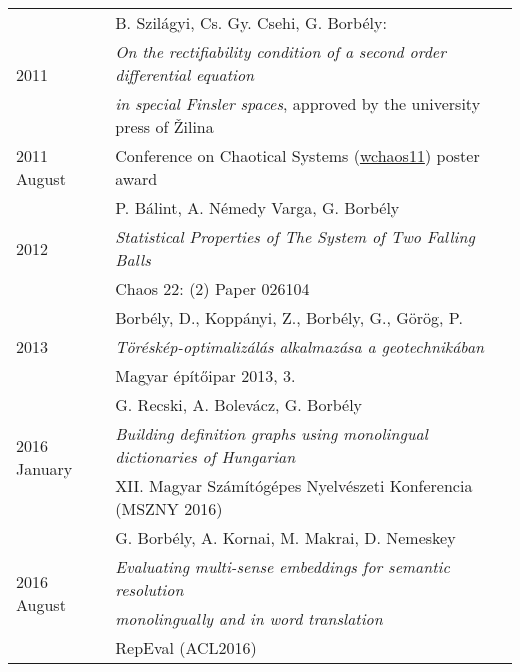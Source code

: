 \documentclass[12pt]{article}
\begin{document}
        \begin{tabular}{p{3.5cm}l}
		   \multirow{3}{*}[15pt]{2011}& B. Szilágyi, Cs. Gy. Csehi, G. Borbély:\\ & \emph{On the rectifiability condition of a second order differential equation}\\
						& \emph{in special Finsler spaces}, approved by the university press of \v{Z}ilina\\
	       2011 August & Conference on Chaotical Systems (\href{http://www.mpipks-dresden.mpg.de/~wchaos11/}{wchaos11}) poster award %
		   \\
			\multirow{3}{*}[15pt]{2012} & P. Bálint, A. Némedy Varga, G. Borbély\\ & \emph{Statistical Properties of The System of Two Falling Balls} \\
			& Chaos 22: (2) Paper 026104
			\\
			\multirow{3}{*}[15pt]{2013} & Borbély, D., Koppányi, Z., Borbély, G., Görög, P.\\ & \emph{Töréskép-optimalizálás alkalmazása a geotechnikában} \\
			& Magyar építőipar 2013, 3.
            \\
            \multirow{3}{*}[15pt]{2016 January} & G. Recski, A. Bolevácz, G. Borbély \\
            & \emph{Building definition graphs using monolingual dictionaries of Hungarian} \\
            & XII. Magyar Számítógépes Nyelvészeti Konferencia (MSZNY 2016)
            \\
            \multirow{4}{*}[15pt]{2016 August} & G. Borbély, A. Kornai, M. Makrai, D. Nemeskey \\
            & \emph{Evaluating multi-sense embeddings for semantic resolution} \\
            & \emph{monolingually and in word translation} \\
            & RepEval (ACL2016)
       \end{tabular}
 \vspace{0.3cm}
\end{document}
